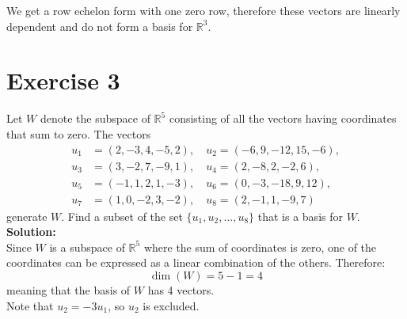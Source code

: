 \documentclass{article}
\begin{document}
We get a row echelon form with one zero row, therefore these vectors are linearly dependent and do not form a basis for $\mathbb{R}^3$.

\newpage

\section*{Exercise 3}
Let $W$ denote the subspace of $\mathbb{R}^5$ consisting of all the vectors having coordinates that sum to zero. The vectors
\begin{align*}
u_1 &= (2,-3,4,-5,2), \quad u_2 = (-6,9,-12,15,-6),\\
u_3 &= (3,-2,7,-9,1), \quad u_4 = (2,-8,2,-2,6),\\
u_5 &= (-1,1,2,1,-3), \quad u_6 = (0,-3,-18,9,12),\\
u_7 &= (1,0,-2,3,-2), \quad u_8 = (2,-1,1,-9,7)
\end{align*}
generate $W$. Find a subset of the set $\{u_1,u_2,\ldots,u_8\}$ that is a basis for $W$. \\

\textbf{Solution:} \\

Since $W$ is a subspace of $\mathbb{R}^5$ where the sum of coordinates is zero, 
one of the coordinates can be expressed as a linear combination of the others. Therefore:
\[\dim(W) = 5 - 1 = 4\]
meaning that the basis of $W$ has 4 vectors. \\

Note that $u_2 = -3u_1$, so $u_2$ is excluded. \\
\end{document}
